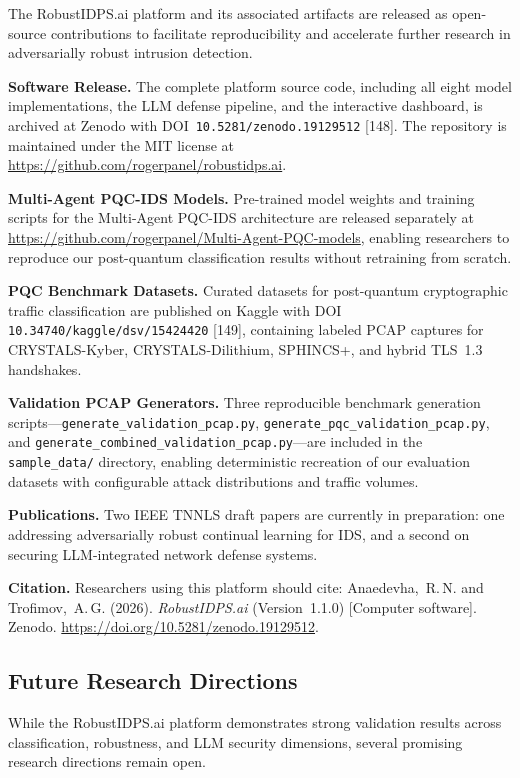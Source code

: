 \documentclass[12pt,a4paper]{article}
\begin{document}
The RobustIDPS.ai platform and its associated artifacts are released as
open-source contributions to facilitate reproducibility and accelerate
further research in adversarially robust intrusion detection.

\textbf{Software Release.} The complete platform source code, including all
eight model implementations, the LLM defense pipeline, and the interactive
dashboard, is archived at Zenodo with DOI~\texttt{10.5281/zenodo.19129512}
[148]. The repository is maintained under the MIT license at
\url{https://github.com/rogerpanel/robustidps.ai}.

\textbf{Multi-Agent PQC-IDS Models.} Pre-trained model weights and training
scripts for the Multi-Agent PQC-IDS architecture are released separately at
\url{https://github.com/rogerpanel/Multi-Agent-PQC-models}, enabling
researchers to reproduce our post-quantum classification results without
retraining from scratch.

\textbf{PQC Benchmark Datasets.} Curated datasets for post-quantum
cryptographic traffic classification are published on Kaggle with DOI
\texttt{10.34740/kaggle/dsv/15424420} [149], containing labeled PCAP
captures for CRYSTALS-Kyber, CRYSTALS-Dilithium, SPHINCS+, and hybrid
TLS~1.3 handshakes.

\textbf{Validation PCAP Generators.} Three reproducible benchmark generation
scripts---\texttt{generate\_validation\_pcap.py},
\texttt{generate\_pqc\_validation\_pcap.py}, and
\texttt{generate\_combined\_validation\_pcap.py}---are included in the
\texttt{sample\_data/} directory, enabling deterministic recreation of our
evaluation datasets with configurable attack distributions and traffic
volumes.

\textbf{Publications.} Two IEEE TNNLS draft papers are currently in
preparation: one addressing adversarially robust continual learning for IDS,
and a second on securing LLM-integrated network defense systems.

\textbf{Citation.} Researchers using this platform should cite:
Anaedevha,~R.\,N. and Trofimov,~A.\,G. (2026). \textit{RobustIDPS.ai}
(Version~1.1.0) [Computer software]. Zenodo.
\url{https://doi.org/10.5281/zenodo.19129512}.

\subsection{Future Research Directions}
\label{subsec:future-directions}

While the RobustIDPS.ai platform demonstrates strong validation results
across classification, robustness, and LLM security dimensions, several
promising research directions remain open.
\end{document}
